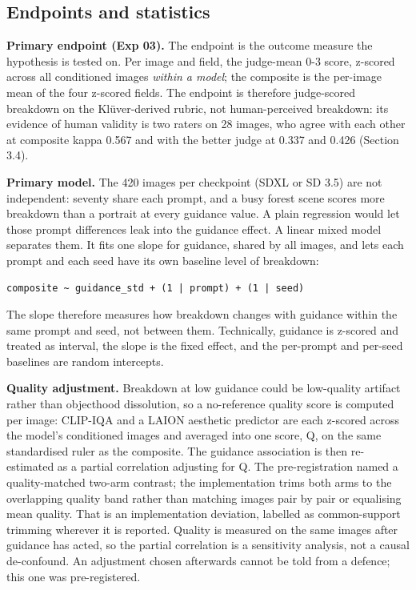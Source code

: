 \documentclass[11pt]{article}
\begin{document}
\subsection{Endpoints and statistics}\label{endpoints-and-statistics}

\textbf{Primary endpoint (Exp 03).} The endpoint is the outcome measure the
hypothesis is tested on. Per image and field, the judge-mean 0-3 score, z-scored
across all conditioned images \emph{within a model}; the composite is the
per-image mean of the four z-scored fields. The endpoint is therefore
judge-scored breakdown on the Klüver-derived rubric, not human-perceived
breakdown: its evidence of human validity is two raters on 28 images, who agree
with each other at composite kappa 0.567 and with the better judge at 0.337 and
0.426 (Section 3.4).

\textbf{Primary model.} The 420 images per checkpoint (SDXL or SD 3.5) are not
independent: seventy share each prompt, and a busy forest scene scores more
breakdown than a portrait at every guidance value. A plain regression would let
those prompt differences leak into the guidance effect. A linear mixed model
separates them. It fits one slope for guidance, shared by all images, and lets
each prompt and each seed have its own baseline level of breakdown:

\begin{verbatim}
composite ~ guidance_std + (1 | prompt) + (1 | seed)
\end{verbatim}

The slope therefore measures how breakdown changes with guidance within the same
prompt and seed, not between them. Technically, guidance is z-scored and treated
as interval, the slope is the fixed effect, and the per-prompt and per-seed
baselines are random intercepts.

\textbf{Quality adjustment.} Breakdown at low guidance could be low-quality
artifact rather than objecthood dissolution, so a no-reference quality score is
computed per image: CLIP-IQA \citep{wang2023clipiqa} and a LAION aesthetic
predictor are each z-scored across the model's conditioned images and averaged
into one score, Q, on the same standardised ruler as the composite. The guidance
association is then re-estimated as a partial correlation adjusting for Q. The
pre-registration named a quality-matched two-arm contrast; the implementation
trims both arms to the overlapping quality band rather than matching images pair
by pair or equalising mean quality. That is an implementation deviation,
labelled as common-support trimming wherever it is reported. Quality is measured
on the same images after guidance has acted, so the partial correlation is a
sensitivity analysis, not a causal de-confound. An adjustment chosen afterwards
cannot be told from a defence; this one was pre-registered.
\end{document}
